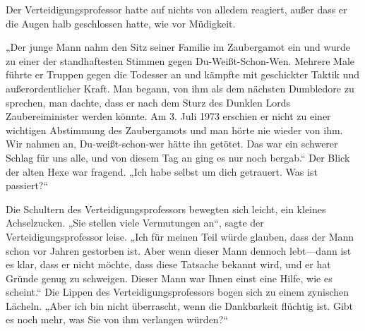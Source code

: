 Der Verteidigungsprofessor hatte auf nichts von alledem reagiert, außer dass er die Augen halb geschlossen hatte, wie vor Müdigkeit.

„Der junge Mann nahm den Sitz seiner Familie im Zaubergamot ein und wurde zu einer der standhaftesten Stimmen gegen Du-Weißt-Schon-Wen. Mehrere Male führte er Truppen gegen die Todesser an und kämpfte mit geschickter Taktik und außerordentlicher Kraft. Man begann, von ihm als dem nächsten Dumbledore zu sprechen, man dachte, dass er nach dem Sturz des Dunklen Lords Zaubereiminister werden könnte. Am 3. Juli 1973 erschien er nicht zu einer wichtigen Abstimmung des Zaubergamots und man hörte nie wieder von ihm. Wir nahmen an, Du-weißt-schon-wer hätte ihn getötet. Das war ein schwerer Schlag für uns alle, und von diesem Tag an ging es nur noch bergab.“ Der Blick der alten Hexe war fragend. „Ich habe selbst um dich getrauert. Was ist passiert?“

Die Schultern des Verteidigungsprofessors bewegten sich leicht, ein kleines Achselzucken. „Sie stellen viele Vermutungen an“, sagte der Verteidigungsprofessor leise. „Ich für meinen Teil würde glauben, dass der Mann schon vor Jahren gestorben ist. Aber wenn dieser Mann dennoch lebt—dann ist es klar, dass er nicht möchte, dass diese Tatsache bekannt wird, und er hat Gründe genug zu schweigen. Dieser Mann war Ihnen einst eine Hilfe, wie es scheint.“ Die Lippen des Verteidigungsprofessors bogen sich zu einem zynischen Lächeln. „Aber ich bin nicht überrascht, wenn die Dankbarkeit flüchtig ist. Gibt es noch mehr, was Sie von ihm verlangen würden?“

